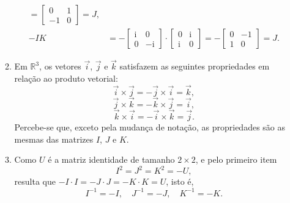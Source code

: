 \documentclass[12pt,a4paper]{article}
\newcommand\ii{\mathrm{i}}
\newcommand*\R{\mathbb{R}}
\begin{document}
\begin{enumerate}
\begin{enumerate}
\begin{align*}
= \begin{bmatrix} 0 & 1 \\ -1 & 0 \end{bmatrix}
= J, \\
-IK
& =  -\begin{bmatrix} \ii & 0 \\ 0 & -\ii \end{bmatrix}
\cdot \begin{bmatrix} 0 & \ii \\ \ii & 0 \end{bmatrix}
=    -\begin{bmatrix} 0 & -1 \\ 1 & 0 \end{bmatrix}
= J.
\end{align*}

\item Em $\R^3$, os vetores $\vec{i}$, $\vec{j}$ e $\vec{k}$ satisfazem as seguintes propriedades em relação ao produto vetorial:
\[
  \vec{i} \times \vec{j}
= - \vec{j} \times \vec{i}
= \vec{k},
\]
\[
  \vec{j} \times \vec{k}
= - \vec{k} \times \vec{j}
= \vec{i},
\]
\[
  \vec{k} \times \vec{i}
= - \vec{i} \times \vec{k}
= \vec{j}.
\]
Percebe-se que, exceto pela mudança de notação, as propriedades são as mesmas das matrizes $I$, $J$ e $K$.

\item Como $U$ é a matriz identidade de tamanho $2 \times 2$, e pelo primeiro item
\[
I^2 = J^2 = K^2 = -U,
\]
resulta que $-I \cdot I = -J \cdot J = -K \cdot K = U$, isto é,
\[
I^{-1} = -I, \quad
J^{-1} = -J, \quad
K^{-1} = -K.
\]

\end{enumerate}


\end{enumerate}
\end{document}
